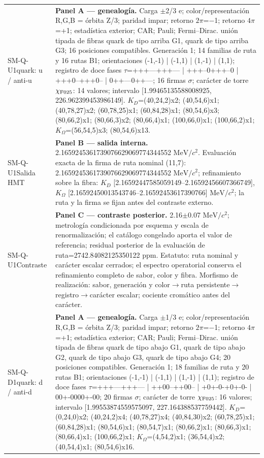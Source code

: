 \begin{longtable}{@{}>{\raggedright\arraybackslash}p{2.55cm}>{\raggedright\arraybackslash}p{11.75cm}@{}}
SM-Q-U1\newline quark: u / anti-u & \textbf{Panel A --- genealogía. }Carga \(\pm\)2/3 e; color/representación R,G,B = órbita Z/3; paridad impar; retorno \(2\pi\)=\(-\)1; retorno \(4\pi\)=+1; estadística exterior; CAR; Pauli; Fermi--Dirac. unión tipada de fibras quark de tipo arriba G1, quark de tipo arriba G3; 16 posiciones compatibles. Generación 1; 14 familias de ruta y 16 rutas B1; orientaciones (-1,-1) | (-1,1) | (1,-1) | (1,1); registro de doce fases \(\tau\)=+++---+++--- | +++--0+++--0 | +++0--+++0-- | 0++---0++---; 16 firmas \(\sigma\); carácter de torre \(\chi_{\rm F025}\): 14 valores; intervalo [1.99465135588008925, 226.962399453986149]. \(K_D\)=(40,24,2)x2; (40,54,6)x1; (40,78,27)x2; (60,78,25)x1; (60,84,28)x1; (80,54,6)x3; (80,66,2)x1; (80,66,3)x2; (80,66,4)x1; (100,66,0)x1; (100,66,2)x1; \(K_{\Omega}\)=(56,54,5)x3; (80,54,6)x13. \\
SM-Q-U1\newline Salida HMT & \textbf{Panel B --- salida interna. }2.1659245361739076629069774344552 \(\mathrm{MeV}/c^2\). Evaluación exacta de la firma de ruta nominal (11,7): 2.1659245361739076629069774344552 \(\mathrm{MeV}/c^2\); refinamiento sobre la fibra: \(K_D\) [2.16592447585059149--2.16592456607366749], \(K_{\Omega}\) [2.16592450013543746--2.16592453617390766] \(\mathrm{MeV}/c^2\); la ruta y la firma se fijan antes del contraste externo. \\
SM-Q-U1\newline Contraste & \textbf{Panel C --- contraste posterior. }2.16\(\pm\)0.07 \(\mathrm{MeV}/c^2\); metrología condicionada por esquema y escala de renormalización; el catálogo congelado aporta el valor de referencia; residual posterior de la evaluación de ruta=2742.84082125350122 ppm. Estatuto: ruta nominal y carácter escalar cerrados; el espectro operatorial conserva el refinamiento completo de sabor, color y fibra. Morfismo de realización: sabor, generación y color\(\to\)\allowbreak{}ruta persistente\(\to\)\allowbreak{}registro\(\to\)\allowbreak{}carácter escalar; cociente cromático antes del carácter. \\\addlinespace[2pt]
SM-Q-D1\newline quark: d / anti-d & \textbf{Panel A --- genealogía. }Carga \(\pm\)1/3 e; color/representación R,G,B = órbita Z/3; paridad impar; retorno \(2\pi\)=\(-\)1; retorno \(4\pi\)=+1; estadística exterior; CAR; Pauli; Fermi--Dirac. unión tipada de fibras quark de tipo abajo G1, quark de tipo abajo G2, quark de tipo abajo G3, quark de tipo abajo G4; 20 posiciones compatibles. Generación 1; 18 familias de ruta y 20 rutas B1; orientaciones (-1,-1) | (-1,1) | (1,-1) | (1,1); registro de doce fases \(\tau\)=+++---+++--- | ++00--++00-- | +0+-0-+0+-0- | 00+-0000+-00; 20 firmas \(\sigma\); carácter de torre \(\chi_{\rm F025}\): 16 valores; intervalo [1.99553874559575097, 227.164388537759442]. \(K_D\)=(0,24,0)x2; (40,24,2)x4; (40,78,27)x4; (40,84,30)x2; (60,78,25)x1; (60,84,28)x1; (80,54,6)x1; (80,54,7)x1; (80,66,2)x1; (80,66,3)x1; (80,66,4)x1; (100,66,2)x1; \(K_{\Omega}\)=(4,54,2)x1; (36,54,4)x2; (40,54,4)x1; (80,54,6)x16. \\

\end{longtable}
